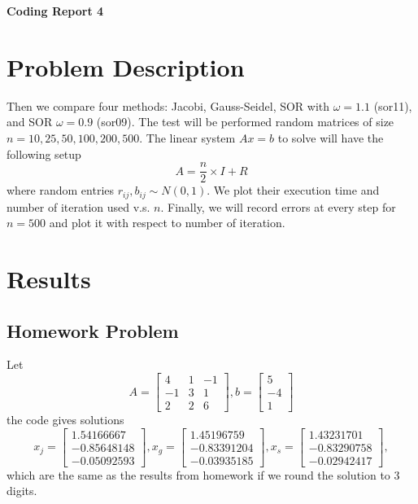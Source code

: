 \documentclass[a4paper,12pt]{article}
\begin{document}
\begin{center} %
	{\Large \bf Coding Report 4} %
	\vspace{2mm}
\end{center}  


\section{Problem Description}

Then we compare four methods: Jacobi, Gauss-Seidel, SOR with $\omega = 1.1$ (sor11), and SOR $\omega = 0.9$ (sor09).
The test will be performed random matrices of size $n = 10, 25, 50, 100, 200, 500$.
The linear system $Ax = b$ to solve will have the following setup
$$
A = \frac{n}{2} \times I + R
$$
where random entries $r_{ij}, b_{ij} \sim N(0, 1)$.
We plot their execution time and number of iteration used v.s. $n$.
Finally, we will record errors at every step for $n = 500$ 
and plot it with respect to number of iteration.

\section{Results}

\subsection{Homework Problem}
Let 
$$
A = \begin{bmatrix}
	4 & 1 & -1 \\
	-1 & 3 & 1 \\
	2 & 2 & 6
\end{bmatrix},
b = \begin{bmatrix}
	5 \\ -4 \\ 1
\end{bmatrix}
$$
the code gives solutions
$$
x_j = \begin{bmatrix}
	 1.54166667 \\
	-0.85648148 \\
	-0.05092593 
\end{bmatrix},
x_g = \begin{bmatrix}
	 1.45196759 \\
	-0.83391204 \\
	-0.03935185 
\end{bmatrix},
x_s = \begin{bmatrix}
	 1.43231701 \\
	-0.83290758 \\
	-0.02942417 
\end{bmatrix},
$$
which are the same as the results from homework if we round the solution to 3 digits.
\end{document}
